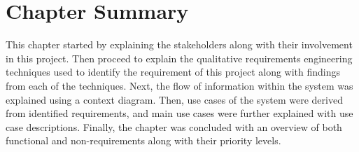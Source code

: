 \section{Chapter Summary}
This chapter started by explaining the stakeholders along with their involvement in this project. Then proceed to explain the qualitative requirements engineering techniques used to identify the requirement of this project along with findings from each of the techniques. Next, the flow of information within the system was explained using a context diagram. Then, use cases of the system were derived from identified requirements, and main use cases were further explained with use case descriptions. Finally, the chapter was concluded with an overview of both functional and non-requirements along with their priority levels.